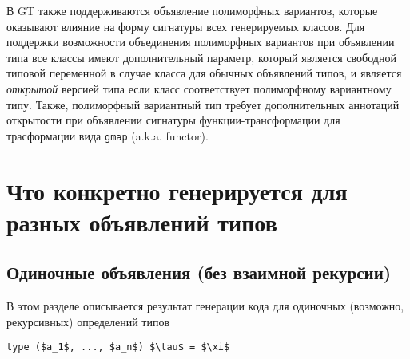 \documentclass[acmsmall,review,anonymous]{acmart}\settopmatter{printfolios=true,printccs=false,printacmref=false}
\begin{document}
В GT также поддерживаются объявление полиморфных вариантов, которые оказывают влияние на форму сигнатуры всех генерируемых классов.
Для поддержки возможности объединения полиморфных вариантов при объявлении типа все классы имеют дополнительный параметр, который 
является свободной типовой переменной в случае класса для обычных объявлений типов, и является \textit{открытой} версией типа если класс 
соответствует полиморфному вариантному типу. Также, полиморфный вариантный тип требует дополнительных аннотаций открытости при объявлении
сигнатуры функции-трансформации для трасформации вида \verb=gmap= (a.k.a. functor).

\section{Что конкретно генерируется для разных объявлений типов}

\subsection{Одиночные объявления (без взаимной рекурсии) }
В этом разделе описывается результат генерации кода для одиночных (возможно, рекурсивных) определений типов

\lstinline{type ($a_1$, ..., $a_n$) $\tau$ = $\xi$}
\end{document}
